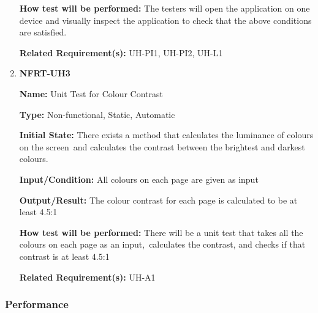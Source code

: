 \documentclass[12pt, titlepage]{article}
\begin{document}
\begin{enumerate}
\textbf{How test will be performed:} The testers will open the application on one device and visually inspect the application to check that the above conditions are satisfied.

\textbf{Related Requirement(s):} UH-PI1, UH-PI2, UH-L1

\item{\textbf{NFRT-UH3}}

\textbf{Name:} Unit Test for Colour Contrast

\textbf{Type:} Non-functional, Static, Automatic
					
\textbf{Initial State:} There exists a method that calculates the luminance of colours on the screen\
and calculates the contrast between the brightest and darkest colours.

\textbf{Input/Condition:} All colours on each page are given as input

\textbf{Output/Result:} The colour contrast for each page is calculated to be at least 4.5:1

\textbf{How test will be performed:} There will be a unit test that takes all the colours on each page as an input,\
calculates the contrast, and checks if that contrast is at least 4.5:1

\textbf{Related Requirement(s):} UH-A1

\end{enumerate}

\subsubsection{Performance}
\end{document}
